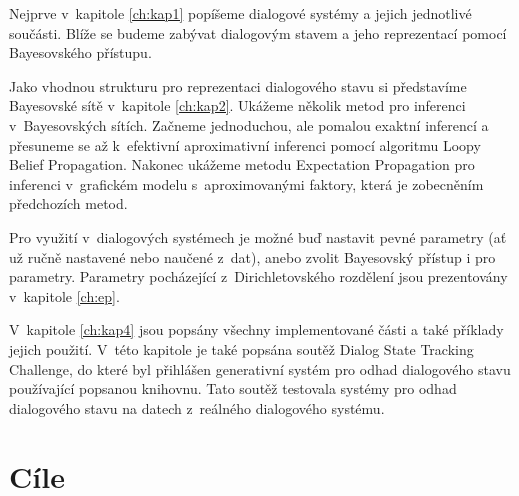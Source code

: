 Nejprve v~kapitole \ref{ch:kap1} popíšeme dialogové systémy a jejich jednotlivé součásti.
Blíže se budeme zabývat dialogovým stavem a jeho reprezentací pomocí Bayesovského přístupu.

Jako vhodnou strukturu pro reprezentaci dialogového stavu si představíme Bayesovské sítě v~kapitole \ref{ch:kap2}.
Ukážeme několik metod pro inferenci v~Bayesovských sítích.
Začneme jednoduchou, ale pomalou exaktní inferencí a přesuneme se až k~efektivní aproximativní inferenci pomocí algoritmu Loopy Belief Propagation.
Nakonec ukážeme metodu Expectation Propagation pro inferenci v~grafickém modelu s~aproximovanými faktory, která je zobecněním předchozích metod.

Pro využití v~dialogových systémech je možné buď nastavit pevné parametry (ať už ručně nastavené nebo naučené z~dat), anebo zvolit Bayesovský přístup i pro parametry.
Parametry pocházející z~Dirichletovského rozdělení jsou prezentovány v~kapitole \ref{ch:ep}.

V~kapitole \ref{ch:kap4} jsou popsány všechny implementované části a také příklady jejich použití.
V~této kapitole je také popsána soutěž Dialog State Tracking Challenge, do které byl přihlášen generativní systém pro odhad dialogového stavu používající popsanou knihovnu.
Tato soutěž testovala systémy pro odhad dialogového stavu na datech z~reálného dialogového systému.

\section*{Cíle}

